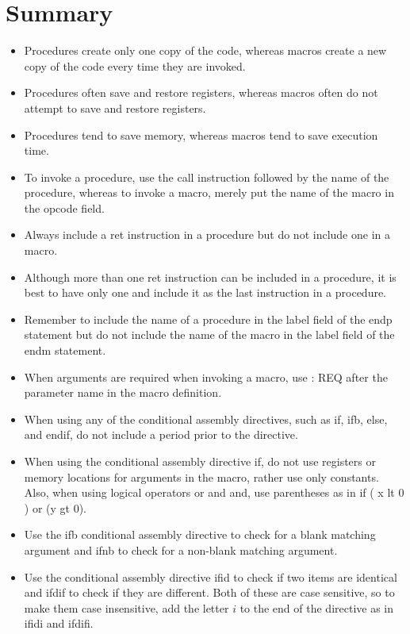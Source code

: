 \documentclass[10pt]{book}
\begin{document}
\section{Summary}
\begin{itemize}
  \item Procedures create only one copy of the code, whereas macros create a new copy of the code every time they are invoked.
  \item Procedures often save and restore registers, whereas macros often do not attempt to save and restore registers.
  \item Procedures tend to save memory, whereas macros tend to save execution time.
  \item To invoke a procedure, use the call instruction followed by the name of the procedure, whereas to invoke a macro, merely put the name of the macro in the opcode field.
  \item Always include a ret instruction in a procedure but do not include one in a macro.
  \item Although more than one ret instruction can be included in a procedure, it is best to have only one and include it as the last instruction in a procedure.
  \item Remember to include the name of a procedure in the label field of the endp statement but do not include the name of the macro in the label field of the endm statement.
  \item When arguments are required when invoking a macro, use : REQ after the parameter name in the macro definition.
  \item When using any of the conditional assembly directives, such as if, ifb, else, and endif, do not include a period prior to the directive.
  \item When using the conditional assembly directive if, do not use registers or memory locations for arguments in the macro, rather use only constants. Also, when using logical operators or and and, use parentheses as in if ( x lt 0 ) or (y gt 0).
  \item Use the ifb conditional assembly directive to check for a blank matching argument and ifnb to check for a non-blank matching argument.
  \item Use the conditional assembly directive ifid to check if two items are identical and ifdif to check if they are different. Both of these are case sensitive, so to make them case insensitive, add the letter $i$ to the end of the directive as in ifidi and ifdifi.
\end{itemize}
\end{document}
